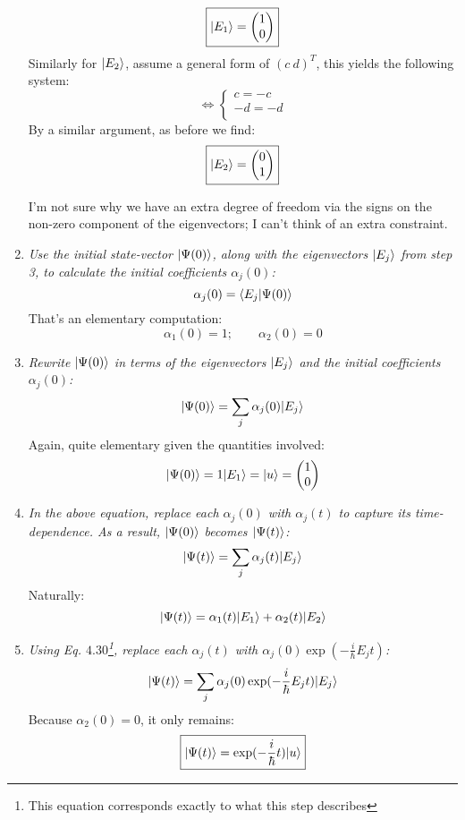 \documentclass[solutions.tex]{subfiles}
\begin{document}
\begin{enumerate}
\[		\boxed{|E_1\rangle = \begin{pmatrix} 1 \\ 0 \\ \end{pmatrix}}
	\]
	Similarly for $|E_2\rangle$, assume a general form of $(c\ d)^T$,
	this yields the following system:
	\[
		\Leftrightarrow \begin{cases}
			c = -c \\
			-d = -d \\
		\end{cases}
	\]
	By a similar argument, as before we find:
	\[
		\boxed{|E_2\rangle = \begin{pmatrix} 0 \\ 1 \\ \end{pmatrix}}
	\]
	\begin{remark} I'm not sure why we have an extra degree
	of freedom via the signs on the non-zero component
	of the eigenvectors; I can't think of an extra constraint.
	\end{remark}
	\item \textit{Use the initial state-vector $|\Psi(0)\rangle$, along with
	the eigenvectors $|E_j\rangle$ from step 3, to calculate the initial
	coefficients $\alpha_j(0)$:
	\[
		\alpha_j(0) = \left\langle E_j \middle| \Psi(0) \right\rangle
	\]}
	That's an elementary computation:
	\[
		\alpha_1(0) = 1;\qquad \alpha_2(0) = 0
	\]
	\item \textit{Rewrite $|\Psi(0)\rangle$ in terms of the eigenvectors
	$|E_j\rangle$ and the initial coefficients $\alpha_j(0)$:
	\[
		|\Psi(0)\rangle = \sum_j\alpha_j(0)|E_j\rangle
	\]}
	Again, quite elementary given the quantities involved:
	\[
		|\Psi(0)\rangle = 1|E_1\rangle = |u\rangle
			= \begin{pmatrix} 1 \\ 0 \\ \end{pmatrix}
	\]
	\item \textit{In the above equation, replace each $\alpha_j(0)$ with
	$\alpha_j(t)$ to capture its time-dependence. As a result, $|\Psi(0)\rangle$
	becomes $|\Psi(t)\rangle$:
	\[
		|\Psi(t)\rangle = \sum_j\alpha_j(t)|E_j\rangle
	\]}
	Naturally:
	\[
		|\Psi(t)\rangle = \alpha_1(t)|E_1\rangle+\alpha_2(t)|E_2\rangle
	\]
	\item \textit{Using Eq. $4.30$\footnote{This equation corresponds
	exactly to what this step describes}, replace each $\alpha_j(t)$ with
	$\alpha_j(0)\exp(-\frac{i}\hbar E_jt)$:
	\[
		|\Psi(t)\rangle = \sum_j\alpha_j(0)\exp(-\frac{i}\hbar E_jt)|E_j\rangle
	\]}
	Because $\alpha_2(0) = 0$, it only remains:
	\[
		\boxed{|\Psi(t)\rangle = \exp(-\frac{i}\hbar t)|u\rangle}
	\]
\end{enumerate}
\end{document}

